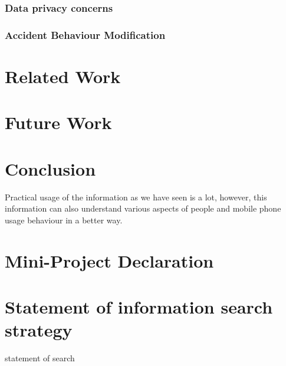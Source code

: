 \documentclass[12pt]{report}
\begin{document}
\subsection{Data privacy concerns}
\subsection{Accident Behaviour Modification}
\chapter{Related Work}
\chapter{Future Work}
\chapter{Conclusion}
Practical usage of the information as we have seen is a lot, however, this information can also understand various aspects of people and mobile phone usage behaviour in a better way.





\appendix
\chapter{Mini-Project Declaration}


\chapter{Statement of information search strategy}

statement of search
\end{document}
